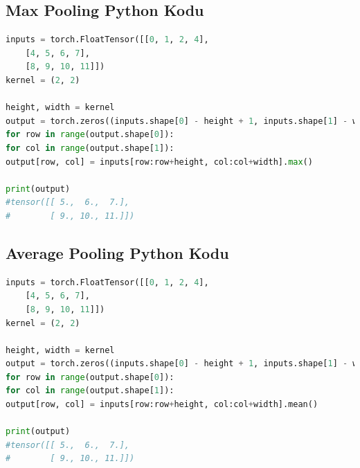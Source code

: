 \subsection{Max Pooling Python Kodu}
\begin{lstlisting}[language=Python]
inputs = torch.FloatTensor([[0, 1, 2, 4],
    [4, 5, 6, 7],
    [8, 9, 10, 11]])
kernel = (2, 2)

height, width = kernel
output = torch.zeros((inputs.shape[0] - height + 1, inputs.shape[1] - width + 1))
for row in range(output.shape[0]):
for col in range(output.shape[1]):
output[row, col] = inputs[row:row+height, col:col+width].max()

print(output)
#tensor([[ 5.,  6.,  7.],
#        [ 9., 10., 11.]])
\end{lstlisting}

\subsection{Average Pooling Python Kodu}
\begin{lstlisting}[language=Python]
inputs = torch.FloatTensor([[0, 1, 2, 4],
    [4, 5, 6, 7],
    [8, 9, 10, 11]])
kernel = (2, 2)

height, width = kernel
output = torch.zeros((inputs.shape[0] - height + 1, inputs.shape[1] - width + 1))
for row in range(output.shape[0]):
for col in range(output.shape[1]):
output[row, col] = inputs[row:row+height, col:col+width].mean()

print(output)
#tensor([[ 5.,  6.,  7.],
#        [ 9., 10., 11.]])
\end{lstlisting}

\newpage